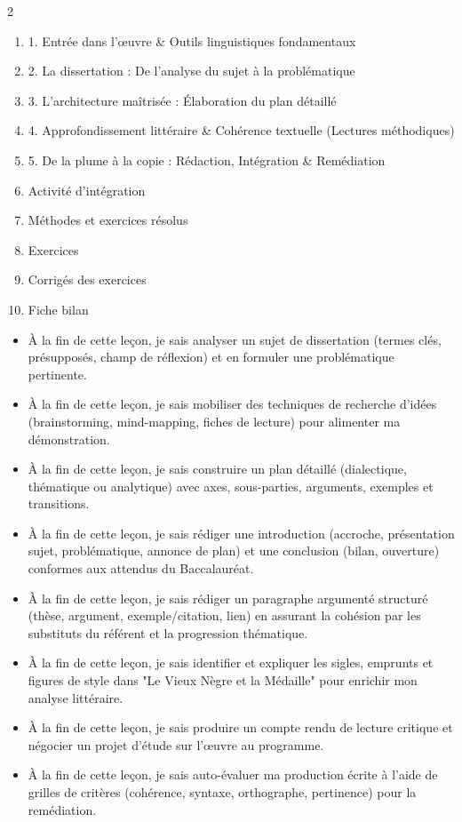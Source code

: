 \documentclass[11pt]{article}
\begin{document}
\begin{sommaire}
\begin{multicols}{2}
\begin{enumerate}
\item 1. Entrée dans l'œuvre \& Outils linguistiques fondamentaux
\item 2. La dissertation : De l'analyse du sujet à la problématique
\item 3. L'architecture maîtrisée : Élaboration du plan détaillé
\item 4. Approfondissement littéraire \& Cohérence textuelle (Lectures méthodiques)
\item 5. De la plume à la copie : Rédaction, Intégration \& Remédiation
\item Activité d'intégration
\item Méthodes et exercices résolus
\item Exercices
\item Corrigés des exercices
\item Fiche bilan
\end{enumerate}
\end{multicols}
\end{sommaire}

\begin{objectifs}
\begin{itemize}
\item À la fin de cette leçon, je sais analyser un sujet de dissertation (termes clés, présupposés, champ de réflexion) et en formuler une problématique pertinente.
\item À la fin de cette leçon, je sais mobiliser des techniques de recherche d'idées (brainstorming, mind-mapping, fiches de lecture) pour alimenter ma démonstration.
\item À la fin de cette leçon, je sais construire un plan détaillé (dialectique, thématique ou analytique) avec axes, sous-parties, arguments, exemples et transitions.
\item À la fin de cette leçon, je sais rédiger une introduction (accroche, présentation sujet, problématique, annonce de plan) et une conclusion (bilan, ouverture) conformes aux attendus du Baccalauréat.
\item À la fin de cette leçon, je sais rédiger un paragraphe argumenté structuré (thèse, argument, exemple/citation, lien) en assurant la cohésion par les substituts du référent et la progression thématique.
\item À la fin de cette leçon, je sais identifier et expliquer les sigles, emprunts et figures de style dans "Le Vieux Nègre et la Médaille" pour enrichir mon analyse littéraire.
\item À la fin de cette leçon, je sais produire un compte rendu de lecture critique et négocier un projet d'étude sur l'œuvre au programme.
\item À la fin de cette leçon, je sais auto-évaluer ma production écrite à l'aide de grilles de critères (cohérence, syntaxe, orthographe, pertinence) pour la remédiation.
\end{itemize}
\end{objectifs}
\end{document}
